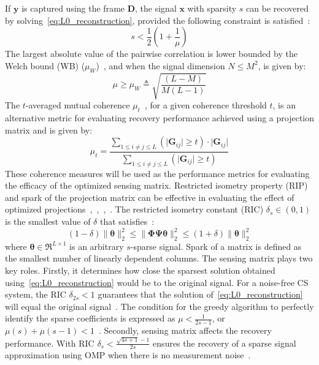If $\bm{y}$ is captured using the frame $\bm{D}$, the signal $\bm{x}$ with sparsity $s$ can be recovered by solving~\eqref{eq:L0_reconstruction}, provided the following constraint is satisfied~\cite{Greed}:
\begin{equation}
    \label{eq:sparse_bound}
    s < \frac{1}{2}\left(1 + \frac{1}{\mu}\right)
\end{equation}
The largest absolute value of the pairwise correlation is lower bounded by the Welch bound (WB) ($\mu_{W}$)~\cite{welch}, and when the signal dimension $N \leq M^{2}$, is given by:
\begin{equation}
    \label{eq:welch}
    \mu \geq \mu_{W} \triangleq \sqrt{\frac{(L-M)}{M(L-1)}}
\end{equation}
The $t$-averaged mutual coherence $\mu_{t}$~\cite{Elad}, for a given coherence threshold $t$, is an alternative metric for evaluating recovery performance achieved using a projection matrix and is given by:
\begin{equation}
    \label{eq:mu_t}
    \mu_{t} = \frac{\underset{1 \leq i\neq j \leq L}{\sum}\left(\lvert \bm{G}_{ij}\rvert\geq t\right)\cdot\lvert \bm{G}_{ij}\rvert}{\underset{1\leq i\neq j\leq L}{\sum}\left(\lvert \bm{G}_{ij}\rvert\geq t\right)}
\end{equation}
These coherence measures will be used as the performance metrics for evaluating the efficacy of the optimized sensing matrix. Restricted isometry property (RIP) and spark of the projection matrix can be effective in evaluating the effect of optimized projections~\cite{Taocandes},~\cite{Donoho},~\cite{Candes_CS},~\cite{Near_optimal}. The restricted isometry constant (RIC) $\delta_{s} \in \left(0,1\right)$ is the smallest value of $\delta$ that satisfies~\cite{Donoho_optimal_sparse}:
\begin{equation}
    \label{RIP}
    (1-\delta)\|\bm{\theta}\|_{2}^{2} \leq \|\bm{\Phi}\bm{\Psi}\bm{\theta}\|_{2}^{2} \leq (1+\delta) \|\bm{\theta}\|_{2}^{2}
\end{equation}
where $\bm{\theta} \in \Re^{L\times 1}$ is an arbitrary $s$-sparse signal. Spark of a matrix is defined as the smallest number of linearly dependent columns. The sensing matrix plays two key roles. Firstly, it determines how close the sparsest solution obtained using~\eqref{eq:L0_reconstruction} would be to the original signal. For a noise-free CS system, the RIC $\delta_{2s} < 1$ guarantees that the solution of~\eqref{eq:L0_reconstruction} will equal the original signal~\cite{Candes_Decoding}. The condition for the greedy algorithm to perfectly identify the sparse coefficients %
is expressed as $\mu < \frac{1}{2s-1}$, or $\mu(s)+\mu(s-1) < 1$~\cite{Greed}. Secondly, sensing matrix affects the recovery performance. With RIC $\delta_{s} < \frac{\sqrt{4s+1}-1}{2s}$ ensures the recovery of a sparse signal approximation using OMP when there is no measurement noise~\cite{RIP_chang}.

